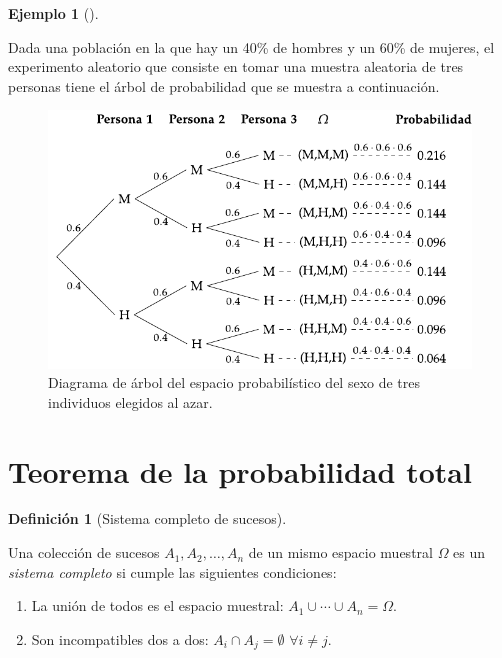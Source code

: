 \documentclass[
  a4paper,
]{scrreport}
\theoremstyle{plain}
\theoremstyle{definition}
\newtheorem{example}{Ejemplo}[chapter]
\theoremstyle{definition}
\newtheorem{definition}{Definición}[chapter]
\theoremstyle{remark}
\begin{document}
\begin{example}[]\protect\hypertarget{exm-arbol-probabilidad-variables-independientes-2}{}\label{exm-arbol-probabilidad-variables-independientes-2}

Dada una población en la que hay un 40\% de hombres y un 60\% de
mujeres, el experimento aleatorio que consiste en tomar una muestra
aleatoria de tres personas tiene el árbol de probabilidad que se muestra
a continuación.

\begin{figure}[H]

{\centering \includegraphics{img/probabilidad/espacio_probabilistico_muestra.pdf}

}

\caption{Diagrama de árbol del espacio probabilístico del sexo de tres
individuos elegidos al azar.}

\end{figure}%

\end{example}

\section{Teorema de la probabilidad
total}\label{teorema-de-la-probabilidad-total}

\begin{definition}[Sistema completo de
sucesos]\protect\hypertarget{def-sistema-completo-sucesos}{}\label{def-sistema-completo-sucesos}

Una colección de sucesos \(A_1,A_2,\ldots,A_n\) de un mismo espacio
muestral \(\Omega\) es un \emph{sistema completo} si cumple las
siguientes condiciones:

\begin{enumerate}
\def\labelenumi{\arabic{enumi}.}
\item
  La unión de todos es el espacio muestral:
  \(A_1\cup \cdots\cup A_n =\Omega\).
\item
  Son incompatibles dos a dos: \(A_i\cap A_j = \emptyset\)
  \(\forall i\neq j\).
\end{enumerate}

\end{definition}
\end{document}
